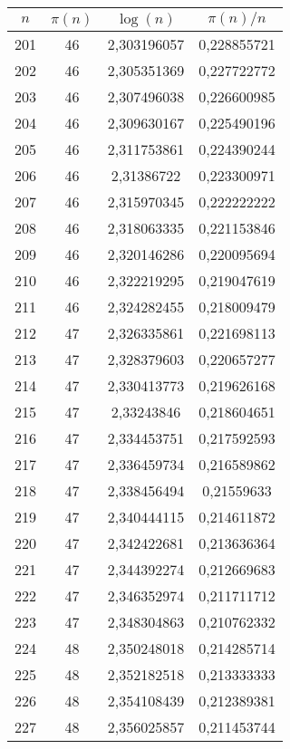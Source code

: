 {\begin{minipage}[!h]{0.45\textwidth}\centering
\tiny
\begin{longtable}{cccc} \hline
\(n\) & \(\pi(n)\) & \(\log(n)\) & \(\pi(n)/n\) \\ \hline201 & 46 & 2,303196057 & 0,228855721 \\ \hline
202 & 46 & 2,305351369 & 0,227722772 \\ \hline
203 & 46 & 2,307496038 & 0,226600985 \\ \hline
204 & 46 & 2,309630167 & 0,225490196 \\ \hline
205 & 46 & 2,311753861 & 0,224390244 \\ \hline
206 & 46 & 2,31386722 & 0,223300971 \\ \hline
207 & 46 & 2,315970345 & 0,222222222 \\ \hline
208 & 46 & 2,318063335 & 0,221153846 \\ \hline
209 & 46 & 2,320146286 & 0,220095694 \\ \hline
210 & 46 & 2,322219295 & 0,219047619 \\ \hline
211 & 46 & 2,324282455 & 0,218009479 \\ \hline
212 & 47 & 2,326335861 & 0,221698113 \\ \hline
213 & 47 & 2,328379603 & 0,220657277 \\ \hline
214 & 47 & 2,330413773 & 0,219626168 \\ \hline
215 & 47 & 2,33243846 & 0,218604651 \\ \hline
216 & 47 & 2,334453751 & 0,217592593 \\ \hline
217 & 47 & 2,336459734 & 0,216589862 \\ \hline
218 & 47 & 2,338456494 & 0,21559633 \\ \hline
219 & 47 & 2,340444115 & 0,214611872 \\ \hline
220 & 47 & 2,342422681 & 0,213636364 \\ \hline
221 & 47 & 2,344392274 & 0,212669683 \\ \hline
222 & 47 & 2,346352974 & 0,211711712 \\ \hline
223 & 47 & 2,348304863 & 0,210762332 \\ \hline
224 & 48 & 2,350248018 & 0,214285714 \\ \hline
225 & 48 & 2,352182518 & 0,213333333 \\ \hline
226 & 48 & 2,354108439 & 0,212389381 \\ \hline
227 & 48 & 2,356025857 & 0,211453744 \\ \hline

\end{longtable}
\end{minipage}}
